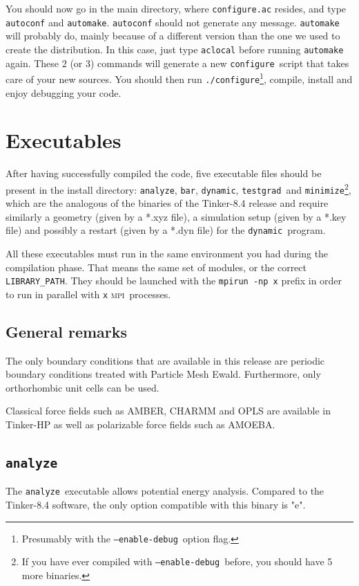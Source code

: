 \documentclass[peerreview]{IEEEtran}
\def\mpi{\textsc{mpi}}
\def\config{\texttt{configure}}
\def\configp{\texttt{./}\config}
\def\enadeb{\texttt{--enable-debug}}
\def\analyze{\texttt{analyze}}
\def\bar{\texttt{bar}}
\def\dynamic{\texttt{dynamic}}
\def\minimize{\texttt{minimize}}
\def\testgrad{\texttt{testgrad}}
\def\mpirun{\texttt{mpirun -np}}
\begin{document}
You should now go in the main directory, where \texttt{configure.ac} resides, and type \texttt{autoconf} and \texttt{automake}. \texttt{autoconf} should not generate any message. \texttt{automake} will probably do, mainly because of a different version than the one we used to create the distribution. In this case, just type \texttt{aclocal} before running \texttt{automake} again. These 2 (or 3) commands will generate a new \config\ script that takes care of your new sources. You should then run \configp\footnote{Presumably with the \enadeb\ option flag.}, compile, install and enjoy debugging your code.

\section{Executables}
After having successfully compiled the code, five executable files should be present in the install directory: \analyze, \bar, \dynamic, \testgrad\ and \minimize\footnote{If you have ever compiled with \enadeb\ before, you should  have 5 more binaries.}, which are the analogous of the binaries of the Tinker-8.4 release and require similarly a geometry (given by a *.xyz file), a simulation setup (given by a *.key file) and possibly a restart (given by a *.dyn file) for the \dynamic\ program. 

All these executables must run in the same environment you had during the compilation phase. That means the same set of modules, or the correct \texttt{LIBRARY\_PATH}. They should be launched with the \mpirun\texttt{ x} prefix in order to run in parallel with \texttt{x} \mpi\  processes. 

\subsection{General remarks}
The only boundary conditions that are available in this release are periodic boundary conditions treated with Particle Mesh Ewald. Furthermore, only orthorhombic unit cells can be used.


Classical force fields such as AMBER, CHARMM and OPLS are available in Tinker-HP as well as polarizable force fields such as AMOEBA.
\subsection{\analyze\ } 
The \analyze\ executable allows potential energy analysis. Compared to the Tinker-8.4 software, the only option compatible with this binary is "e".
\end{document}
